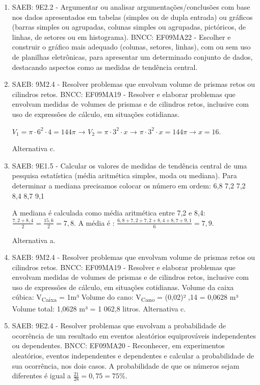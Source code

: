 \begin{enumerate}
\item
SAEB: 9E2.2 - Argumentar ou analisar argumentações/conclusões com base
nos dados apresentados em tabelas (simples ou de dupla entrada) ou
gráficos (barras simples ou agrupadas, colunas simples ou agrupadas,
pictóricos, de linhas, de setores ou em histograma).
BNCC: EF09MA22 - Escolher e construir o gráfico mais adequado (colunas,
setores, linhas), com ou sem uso de planilhas eletrônicas, para
apresentar um determinado conjunto de dados, destacando aspectos como as
medidas de tendência central.

\item
SAEB: 9M2.4 - Resolver problemas que envolvam volume de prismas retos ou
cilindros retos.
BNCC: EF09MA19 - Resolver e elaborar problemas que envolvam medidas de
volumes de prismas e de cilindros retos, inclusive com uso de expressões
de cálculo, em situações cotidianas.

$V_{1} = \pi \cdot 6^{2} \cdot 4 = 144\pi$ →
$V_{2} = \pi \cdot 3^{2} \cdot x$ →
$\pi \cdot 3^{2} \cdot x = 144\pi \rightarrow x = 16.$

Alternativa c.

\item
SAEB: 9E1.5 - Calcular os valores de medidas de tendência central de uma
pesquisa estatística (média aritmética simples, moda ou mediana).
Para determinar a mediana precisamos colocar os número em ordem:
6,8 7,2 7,2 8,4 8,7 9,1

A mediana é calculada como média aritmética entre 7,2 e 8,4:
$\frac{7,2 + 8,4}{2} = \frac{15,6}{2} = 7,8$. A média é :
$\frac{6,8 + 7,2 + 7,2 + 8,4 + 8,7 + 9,1}{6} = 7,9$.

Alternativa a.

\item
SAEB: 9M2.4 - Resolver problemas que envolvam volume de prismas retos ou
cilindros retos.
BNCC: EF09MA19 - Resolver e elaborar problemas que envolvam medidas de
volumes de prismas e de cilindros retos, inclusive com uso de expressões
de cálculo, em situações cotidianas.
Volume da caixa cúbica: V\textsubscript{Caixa} = 1m³
Volume do cano: V\textsubscript{Cano} = (0,02)² ,14  = 0,0628 m³
Volume total: 1,0628 m³ = 1 062,8 litros.
Alternativa c.

\item
SAEB: 9E2.4 - Resolver problemas que envolvam a probabilidade de
ocorrência de um resultado em eventos aleatórios equiprováveis
independentes ou dependentes.
BNCC: EF09MA20 - Reconhecer, em experimentos aleatórios, eventos
independentes e dependentes e calcular a probabilidade de sua
ocorrência, nos dois casos.
A probabilidade de que os números sejam diferentes é igual a
$\frac{21}{28} = 0,75 = 75\%.$


\end{enumerate}
